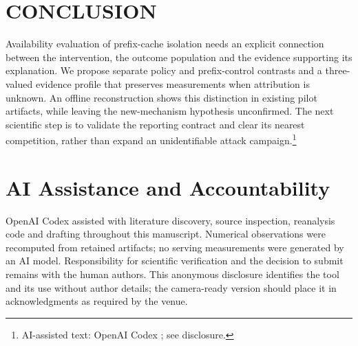 \documentclass[a4paper,twoside]{article}
\newcommand{\aicite}{\footnote{AI-assisted text: OpenAI Codex \cite{codex}; see disclosure.}}
\begin{document}
\section{\uppercase{Conclusion}}

Availability evaluation of prefix-cache isolation needs an explicit connection between the intervention, the outcome population and the evidence supporting its explanation. We propose separate policy and prefix-control contrasts and a three-valued evidence profile that preserves measurements when attribution is unknown. An offline reconstruction shows this distinction in existing pilot artifacts, while leaving the new-mechanism hypothesis unconfirmed. The next scientific step is to validate the reporting contract and clear its nearest competition, rather than expand an unidentifiable attack campaign.\aicite

\section*{AI Assistance and Accountability}

OpenAI Codex \cite{codex} assisted with literature discovery, source inspection, reanalysis code and drafting throughout this manuscript. Numerical observations were recomputed from retained artifacts; no serving measurements were generated by an AI model. Responsibility for scientific verification and the decision to submit remains with the human authors. This anonymous disclosure identifies the tool and its use without author details; the camera-ready version should place it in acknowledgments as required by the venue.



\end{document}
